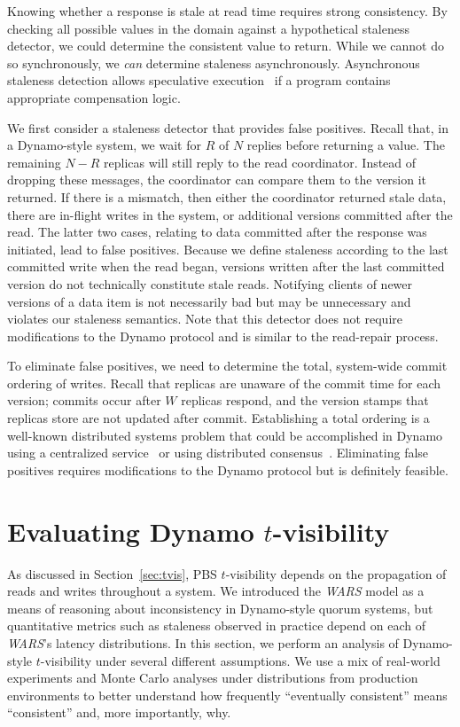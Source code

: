 \documentclass{vldb}
\newcommand{\sectionskip}{-0em}
\begin{document}
Knowing whether a response is stale at read time requires strong
consistency.  By checking all possible values in the domain against a
hypothetical staleness detector, we could determine the consistent
value to return.  While we cannot do so synchronously, we \textit{can}
determine staleness asynchronously.  Asynchronous staleness detection
allows speculative execution~\cite{nsdispeculation} if a program
contains appropriate compensation logic.

We first consider a staleness detector that provides false positives.
Recall that, in a Dynamo-style system, we wait for $R$ of $N$ replies
before returning a value.  The remaining $N-R$ replicas will still
reply to the read coordinator.  Instead of dropping these messages,
the coordinator can compare them to the version it returned.  If there
is a mismatch, then either the coordinator returned stale data, there
are in-flight writes in the system, or additional versions committed
after the read. The latter two cases, relating to data committed after
the response was initiated, lead to false positives.  Because we
define staleness according to the last committed write when the read
began, versions written after the last committed version do not
technically constitute stale reads.  Notifying clients of newer
versions of a data item is not necessarily bad but may be unnecessary
and violates our staleness semantics.  Note that this detector does
not require modifications to the Dynamo protocol and is similar to the
read-repair process.

To eliminate false positives, we need to determine the total,
system-wide commit ordering of writes. Recall that replicas are
unaware of the commit time for each version; commits occur after $W$
replicas respond, and the version stamps that replicas store are not
updated after commit.  Establishing a total ordering is a well-known
distributed systems problem that could be accomplished in Dynamo using
a centralized service~\cite{zookeeper} or using distributed
consensus~\cite{paxos}.  Eliminating false positives requires
modifications to the Dynamo protocol but is definitely feasible.



\vspace{\sectionskip}\section{Evaluating Dynamo {\large $t$}-visibility}
\label{sec:dynamoeval}

As discussed in Section~\ref{sec:tvis}, PBS $t$-visibility depends on
the propagation of reads and writes throughout a system.  We
introduced the \textit{WARS}  model as a means of reasoning about
inconsistency in Dynamo-style quorum systems, but quantitative metrics
such as staleness observed in practice depend on each of \textit{WARS}'s
latency distributions.  In this section, we perform an analysis of
Dynamo-style $t$-visibility under several different assumptions.  We
use a mix of real-world experiments and Monte Carlo analyses
under distributions from production environments to better
understand how frequently ``eventually consistent'' means
``consistent'' and, more importantly, why.
\end{document}

